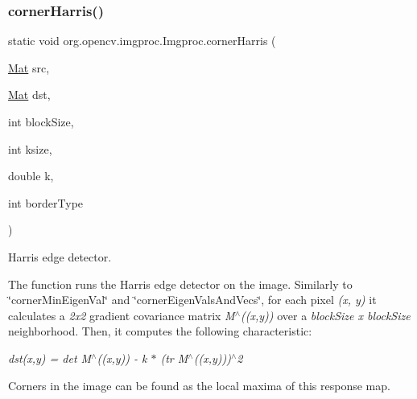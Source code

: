 \subsubsection{\texorpdfstring{corner\+Harris()}{cornerHarris()}\hspace{0.1cm}{\footnotesize\ttfamily [1/2]}}
{\footnotesize\ttfamily static void org.\+opencv.\+imgproc.\+Imgproc.\+corner\+Harris (\begin{DoxyParamCaption}\item[{\mbox{\hyperlink{classorg_1_1opencv_1_1core_1_1_mat}{Mat}}}]{src,  }\item[{\mbox{\hyperlink{classorg_1_1opencv_1_1core_1_1_mat}{Mat}}}]{dst,  }\item[{int}]{block\+Size,  }\item[{int}]{ksize,  }\item[{double}]{k,  }\item[{int}]{border\+Type }\end{DoxyParamCaption})\hspace{0.3cm}{\ttfamily [static]}}

Harris edge detector.

The function runs the Harris edge detector on the image. Similarly to \char`\"{}corner\+Min\+Eigen\+Val\char`\"{} and \char`\"{}corner\+Eigen\+Vals\+And\+Vecs\char`\"{}, for each pixel {\itshape (x, y)} it calculates a {\itshape 2x2} gradient covariance matrix {\itshape M$^\wedge$((x,y))} over a {\itshape block\+Size x block\+Size} neighborhood. Then, it computes the following characteristic\+:

{\itshape dst(x,y) = det M$^\wedge$((x,y)) -\/ k $\ast$ (tr M$^\wedge$((x,y)))$^\wedge$2}

Corners in the image can be found as the local maxima of this response map.


